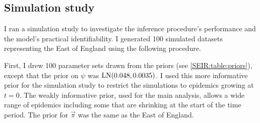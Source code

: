 \documentclass[thesis.tex]{subfiles}
\begin{document}
\subsection{Simulation study} \label{SEIR:sec:sim-study}

I ran a simulation study to investigate the inference procedure's performance and the model's practical identifiability.
I generated 100 simulated datasets representing the East of England using the following procedure.

First, I drew 100 parameter sets drawn from the priors (see \cref{SEIR:table:priors}), except that the prior on $\psi$ was $\operatorname{LN}(0.048, 0.0035)$.
I used this more informative prior for the simulation study to restrict the simulations to epidemics growing at $t=0$.
The weakly informative prior, used for the main analysis, allows a wide range of epidemics including some that are shrinking at the start of the time period.
The prior for $\vec{\pi}$ was the same as the East of England.
\end{document}
